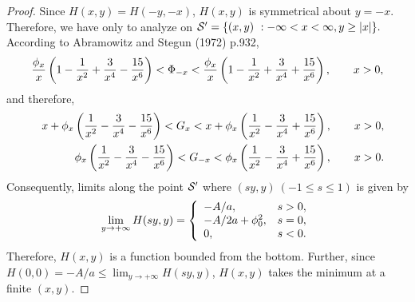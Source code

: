 \begin{proof}
Since $H(x,y)=H(-y,-x)$, $H(x,y)$ is symmetrical about $y=-x$.  Therefore, we have only to analyze on
 ${\cal S}' = \{ (x,y)\ : -\infty < x < \infty, y \geq |x| \}.$  According to Abramowitz and Stegun (1972) p.932,
\[ %
  \frac{\px}{x} \left( 1 - \frac{1}{x^2} + \frac{3}{x^4} - \frac{15}{x^6} \right) <
  \Pmx < \frac{\px}{x} \left( 1 - \frac{1}{x^2} + \frac{3}{x^4} + \frac{15}{x^6} \right), \qquad
  x > 0,
\] %
and therefore,
\begin{eqnarray*}
  & & x + \phi_x \left( \frac{1}{x^2} - \frac{3}{x^4} - \frac{15}{x^6} \right) < G_x
      < x + \phi_x \left(\frac{1}{x^2} - \frac{3}{x^4} + \frac{15}{x^6} \right), \qquad x > 0, \label{eq_l54} \\
  & & \phi_x \left( \frac{1}{x^2} - \frac{3}{x^4} - \frac{15}{x^6} \right) < G_{-x}
      < \phi_x \left(\frac{1}{x^2} - \frac{3}{x^4} + \frac{15}{x^6} \right), \qquad x > 0. \label{eq_l55}
\end{eqnarray*}
Consequently, limits along the point ${\cal S}'$ where $(sy,y)\ (-1 \leq s \leq 1)$ is given by
\[
 \lim_{y \rightarrow + \infty} H(sy,y) = \left\{
 \begin{array}{ll}
   -A/a, \quad & s > 0, \\
   -A/2a+\p0^2, & s = 0, \\
   0, & s < 0.
 \end{array}
 \right.
\]
Therefore, $H(x,y)$ is a function bounded from the bottom.  Further, since $H(0,0)=-A/a \leq \lim_{y \rightarrow +\infty} H(sy,y)$, $H(x,y)$ takes the minimum at a finite $(x,y)$.
\end{proof}

